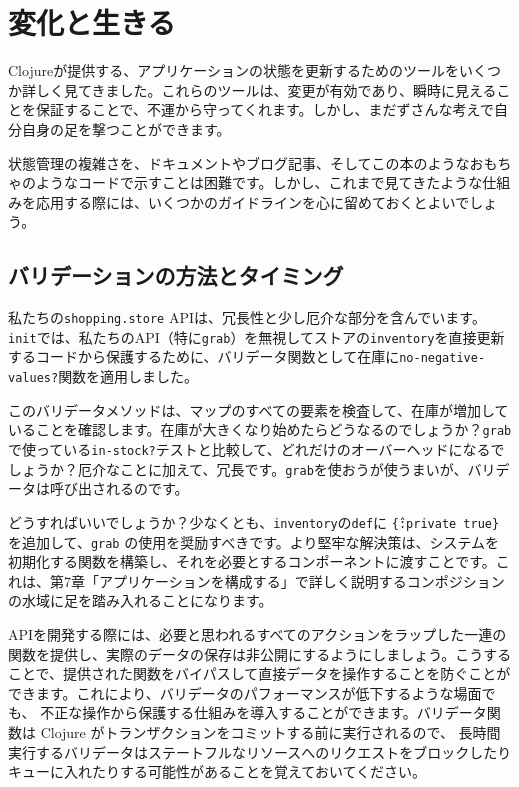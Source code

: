 \section{変化と生きる}

Clojureが提供する、アプリケーションの状態を更新するためのツールをいくつか詳しく見てきました。これらのツールは、変更が有効であり、瞬時に見えることを保証することで、不運から守ってくれます。しかし、まだずさんな考えで自分自身の足を撃つことができます。

状態管理の複雑さを、ドキュメントやブログ記事、そしてこの本のようなおもちゃのようなコードで示すことは困難です。しかし、これまで見てきたような仕組みを応用する際には、いくつかのガイドラインを心に留めておくとよいでしょう。

\subsection{バリデーションの方法とタイミング}

私たちの\texttt{shopping.store} APIは、冗長性と少し厄介な部分を含んでいます。\texttt{init}では、私たちのAPI（特に\texttt{grab}）を無視してストアの\texttt{inventory}を直接更新するコードから保護するために、バリデータ関数として在庫に\texttt{no-negative-values?}関数を適用しました。

このバリデータメソッドは、マップのすべての要素を検査して、在庫が増加していることを確認します。在庫が大きくなり始めたらどうなるのでしょうか？\texttt{grab}で使っている\texttt{in-stock?}テストと比較して、どれだけのオーバーヘッドになるでしょうか？厄介なことに加えて、冗長です。\texttt{grab}を使おうが使うまいが、バリデータは呼び出されるのです。

どうすればいいでしょうか？少なくとも、\texttt{inventory}の\texttt{def}に \texttt{\^\{:private true\}} を追加して、\texttt{grab} の使用を奨励すべきです。より堅牢な解決策は、システムを初期化する関数を構築し、それを必要とするコンポーネントに渡すことです。これは、第7章「アプリケーションを構成する」で詳しく説明するコンポジションの水域に足を踏み入れることになります。

APIを開発する際には、必要と思われるすべてのアクションをラップした一連の関数を提供し、実際のデータの保存は非公開にするようにしましょう。こうすることで、提供された関数をバイパスして直接データを操作することを防ぐことができます。これにより、バリデータのパフォーマンスが低下するような場面でも、 不正な操作から保護する仕組みを導入することができます。バリデータ関数は Clojure がトランザクションをコミットする前に実行されるので、 長時間実行するバリデータはステートフルなリソースへのリクエストをブロックしたり キューに入れたりする可能性があることを覚えておいてください。

